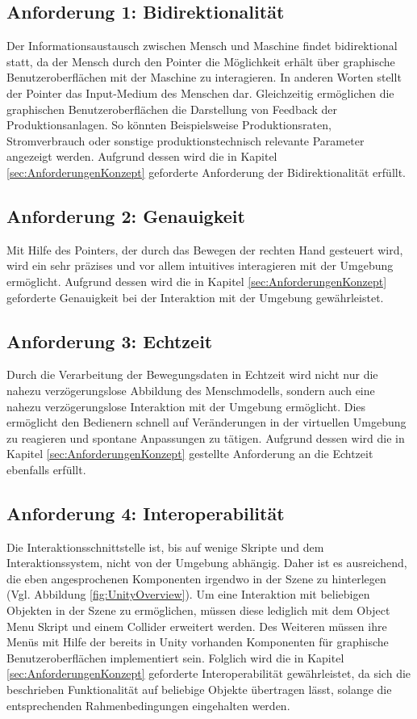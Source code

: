 \subsection{Anforderung 1: Bidirektionalität}\label{sec:ValidInteraktion1}
Der Informationsaustausch zwischen Mensch und Maschine findet bidirektional statt, da der Mensch durch den Pointer die Möglichkeit erhält über graphische Benutzeroberflächen mit der Maschine zu interagieren. In anderen Worten stellt der Pointer das Input-Medium des Menschen dar. Gleichzeitig ermöglichen die graphischen Benutzeroberflächen die Darstellung von Feedback der Produktionsanlagen. So könnten Beispielsweise Produktionsraten, Stromverbrauch oder sonstige produktionstechnisch relevante Parameter angezeigt werden. Aufgrund dessen wird die in Kapitel \ref{sec:AnforderungenKonzept} geforderte Anforderung der Bidirektionalität erfüllt.

\subsection{Anforderung 2: Genauigkeit}\label{sec:ValidInteraktion2}
Mit Hilfe des Pointers, der durch das Bewegen der rechten Hand gesteuert wird, wird ein sehr präzises und vor allem intuitives interagieren mit der Umgebung ermöglicht. Aufgrund dessen wird die in Kapitel \ref{sec:AnforderungenKonzept} geforderte Genauigkeit bei der Interaktion mit der Umgebung gewährleistet.

\subsection{Anforderung 3: Echtzeit}\label{sec:ValidInteraktion3}
Durch die Verarbeitung der Bewegungsdaten in Echtzeit wird nicht nur die nahezu verzögerungslose Abbildung des Menschmodells, sondern auch eine nahezu verzögerungslose Interaktion mit der Umgebung ermöglicht. Dies ermöglicht den Bedienern schnell auf Veränderungen in der virtuellen Umgebung zu reagieren und spontane Anpassungen zu tätigen. Aufgrund dessen wird die in Kapitel \ref{sec:AnforderungenKonzept} gestellte Anforderung an die Echtzeit ebenfalls erfüllt.

\subsection{Anforderung 4: Interoperabilität}\label{sec:ValidInteraktion4}
Die Interaktionsschnittstelle ist, bis auf wenige Skripte und dem Interaktionssystem, nicht von der Umgebung abhängig. Daher ist es ausreichend, die eben angesprochenen Komponenten irgendwo in der Szene zu hinterlegen (Vgl. Abbildung \ref{fig:UnityOverview}). Um eine Interaktion mit beliebigen Objekten in der Szene zu ermöglichen, müssen diese lediglich mit dem Object Menu Skript und einem Collider erweitert werden. Des Weiteren müssen ihre Menüs mit Hilfe der bereits in Unity vorhanden Komponenten für graphische Benutzeroberflächen implementiert sein. Folglich wird die in Kapitel \ref{sec:AnforderungenKonzept} geforderte Interoperabilität gewährleistet, da sich die beschrieben Funktionalität auf beliebige Objekte übertragen lässt, solange die entsprechenden Rahmenbedingungen eingehalten werden.

